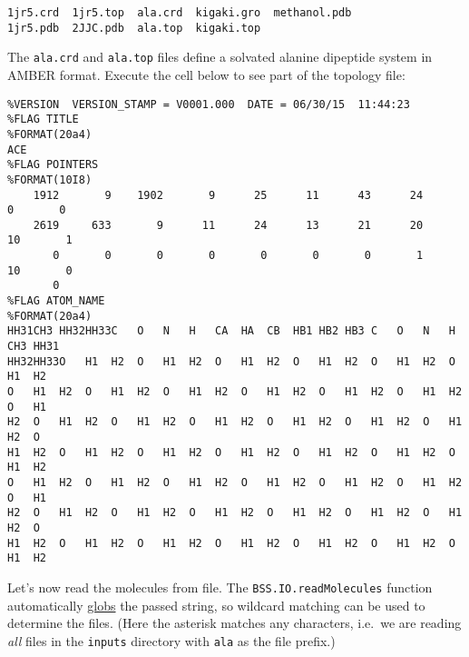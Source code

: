 \begin{verbatim}
1jr5.crd  1jr5.top  ala.crd  kigaki.gro  methanol.pdb
1jr5.pdb  2JJC.pdb  ala.top  kigaki.top
\end{verbatim}

The \texttt{ala.crd} and \texttt{ala.top} files define a solvated
alanine dipeptide system in AMBER format. Execute the cell below to see
part of the topology file:

\begin{Shaded}
\begin{Highlighting}[]
\OperatorTok{!}\OperatorTok{-}\OperatorTok{/}
\end{Highlighting}
\end{Shaded}

\begin{verbatim}
%VERSION  VERSION_STAMP = V0001.000  DATE = 06/30/15  11:44:23                  
%FLAG TITLE                                                                     
%FORMAT(20a4)                                                                   
ACE                                                                             
%FLAG POINTERS                                                                  
%FORMAT(10I8)                                                                   
    1912       9    1902       9      25      11      43      24       0       0
    2619     633       9      11      24      13      21      20      10       1
       0       0       0       0       0       0       0       1      10       0
       0
%FLAG ATOM_NAME                                                                 
%FORMAT(20a4)                                                                   
HH31CH3 HH32HH33C   O   N   H   CA  HA  CB  HB1 HB2 HB3 C   O   N   H   CH3 HH31
HH32HH33O   H1  H2  O   H1  H2  O   H1  H2  O   H1  H2  O   H1  H2  O   H1  H2  
O   H1  H2  O   H1  H2  O   H1  H2  O   H1  H2  O   H1  H2  O   H1  H2  O   H1  
H2  O   H1  H2  O   H1  H2  O   H1  H2  O   H1  H2  O   H1  H2  O   H1  H2  O   
H1  H2  O   H1  H2  O   H1  H2  O   H1  H2  O   H1  H2  O   H1  H2  O   H1  H2  
O   H1  H2  O   H1  H2  O   H1  H2  O   H1  H2  O   H1  H2  O   H1  H2  O   H1  
H2  O   H1  H2  O   H1  H2  O   H1  H2  O   H1  H2  O   H1  H2  O   H1  H2  O   
H1  H2  O   H1  H2  O   H1  H2  O   H1  H2  O   H1  H2  O   H1  H2  O   H1  H2  
\end{verbatim}

Let's now read the molecules from file. The
\texttt{BSS.IO.readMolecules} function automatically
\href{https://en.wikipedia.org/wiki/Glob_(programming)}{globs} the
passed string, so wildcard matching can be used to determine the files.
(Here the asterisk matches any characters, i.e.~we are reading
\emph{all} files in the \texttt{inputs} directory with \texttt{ala} as
the file prefix.)

